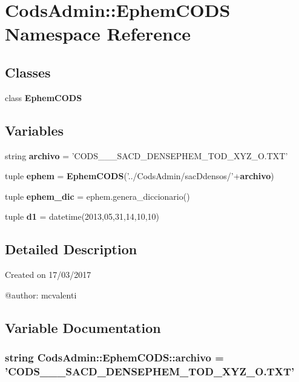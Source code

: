 \section{\-Cods\-Admin\-:\-:\-Ephem\-C\-O\-D\-S \-Namespace \-Reference}
\label{namespace_cods_admin_1_1_ephem_c_o_d_s}
\subsection*{\-Classes}
\begin{DoxyCompactItemize}
\item 
class {\bf \-Ephem\-C\-O\-D\-S}
\end{DoxyCompactItemize}
\subsection*{\-Variables}
\begin{DoxyCompactItemize}
\item 
string {\bf archivo} = '\-C\-O\-D\-S\-\_\-\_\-\_\-\-S\-A\-C\-D\-\_\-\-D\-E\-N\-S\-E\-P\-H\-E\-M\-\_\-\-T\-O\-D\-\_\-\-X\-Y\-Z\-\_\-\-O.\-T\-X\-T'
\item 
tuple {\bf ephem} = {\bf \-Ephem\-C\-O\-D\-S}('../\-Cods\-Admin/sac\-Ddensos/'+{\bf archivo})
\item 
tuple {\bf ephem\-\_\-dic} = ephem.\-genera\-\_\-diccionario()
\item 
tuple {\bf d1} = datetime(2013,05,31,14,10,10)
\end{DoxyCompactItemize}


\subsection{\-Detailed \-Description}
\begin{DoxyVerb}
Created on 17/03/2017

@author: mcvalenti
\end{DoxyVerb}
 

\subsection{\-Variable \-Documentation}
\subsubsection[{archivo}]{\setlength{\rightskip}{0pt plus 5cm}string {\bf \-Cods\-Admin\-::\-Ephem\-C\-O\-D\-S\-::archivo} = '\-C\-O\-D\-S\-\_\-\_\-\_\-\-S\-A\-C\-D\-\_\-\-D\-E\-N\-S\-E\-P\-H\-E\-M\-\_\-\-T\-O\-D\-\_\-\-X\-Y\-Z\-\_\-\-O.\-T\-X\-T'}\label{namespace_cods_admin_1_1_ephem_c_o_d_s_a93bf2496a4a3bd82563934c441e69470}


